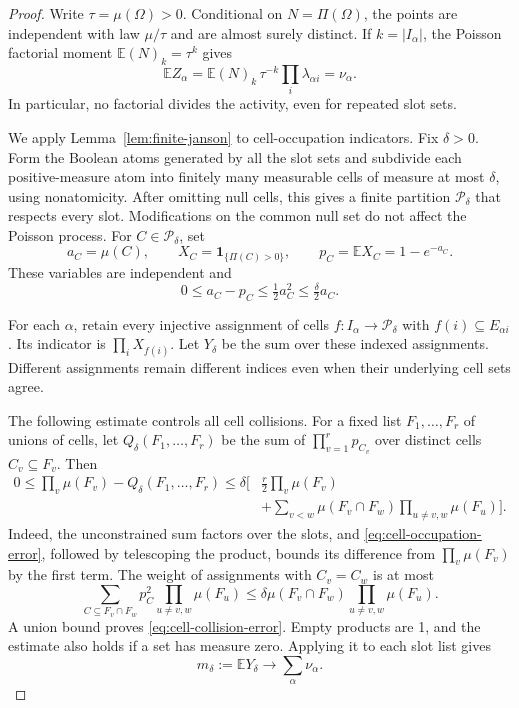 \begin{proof}
Write $\tau=\mu(\Omega)>0$. Conditional on $N=\Pi(\Omega)$, the
points are independent with law $\mu/\tau$ and are almost surely
distinct. If $k=|I_\alpha|$, the Poisson factorial moment
$\mathbb{E}(N)_k=\tau^k$ gives
\[
 \mathbb{E}Z_\alpha
 =\mathbb{E}(N)_k\,\tau^{-k}\prod_i\lambda_{\alpha i}
 =\nu_\alpha.
\]
In particular, no factorial divides the activity, even for repeated
slot sets.

We apply Lemma~\ref{lem:finite-janson} to cell-occupation indicators.
Fix $\delta>0$. Form the Boolean atoms generated by all the slot sets
and subdivide each positive-measure atom into finitely many measurable
cells of measure at most $\delta$, using nonatomicity. After omitting
null cells, this gives a finite partition $\mathcal P_\delta$ that
respects every slot. Modifications on the common null set do not affect
the Poisson process. For $C\in\mathcal P_\delta$, set
\[
 a_C=\mu(C),\qquad X_C=\mathbf1_{\{\Pi(C)>0\}},\qquad
 p_C=\mathbb{E}X_C=1-e^{-a_C}.
\]
These variables are independent and
\begin{equation}
 0\le a_C-p_C\le\tfrac12a_C^2\le\tfrac\delta2a_C.
 \label{eq:cell-occupation-error}
\end{equation}

For each $\alpha$, retain every injective assignment of cells
$f:I_\alpha\to\mathcal P_\delta$ with $f(i)\subseteq E_{\alpha i}$.
Its indicator is $\prod_iX_{f(i)}$. Let $Y_\delta$ be the sum over
these indexed assignments. Different assignments remain different
indices even when their underlying cell sets agree.

The following estimate controls all cell collisions. For a fixed list
$F_1,\ldots,F_r$ of unions of cells, let $Q_\delta(F_1,\ldots,F_r)$
be the sum of $\prod_{v=1}^rp_{C_v}$ over distinct cells
$C_v\subseteq F_v$. Then
\begin{equation}
 \begin{split}
 0\le\prod_v\mu(F_v)-Q_\delta(F_1,\ldots,F_r)
 \le\delta\bigg[&\frac r2\prod_v\mu(F_v)\\
 &+\sum_{v<w}\mu(F_v\cap F_w)
                      \prod_{u\ne v,w}\mu(F_u)\bigg].
 \end{split}
 \label{eq:cell-collision-error}
\end{equation}
Indeed, the unconstrained sum factors over the slots, and
\eqref{eq:cell-occupation-error}, followed by telescoping the product,
bounds its difference from $\prod_v\mu(F_v)$ by the first term.
The weight of assignments with $C_v=C_w$ is at most
\[
 \sum_{C\subseteq F_v\cap F_w}p_C^2
       \prod_{u\ne v,w}\mu(F_u)
 \le\delta\mu(F_v\cap F_w)\prod_{u\ne v,w}\mu(F_u).
\]
A union bound proves \eqref{eq:cell-collision-error}. Empty products
are 1, and the estimate also holds if a set has measure zero.
Applying it to each slot list gives
\begin{equation}
 m_\delta:=\mathbb{E}Y_\delta\longrightarrow\sum_\alpha\nu_\alpha.
 \label{eq:cell-mean-limit}
\end{equation}


\end{proof}
